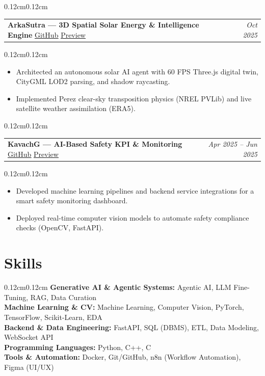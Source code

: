 \documentclass[10pt, letterpaper]{article}
\makeatletter
\newenvironment{onecolentry}
{\begin{adjustwidth}{0.12cm}{0.12cm}}
{\end{adjustwidth}}
\newenvironment{twocolentry}
{\begin{adjustwidth}{0.12cm}{0.12cm}
\begin{tabular*}{\linewidth}{l @{\extracolsep{\fill}} r}}
{\end{tabular*}
\end{adjustwidth}}
\newenvironment{highlights}
{\begin{itemize}[leftmargin=0.36cm, itemsep=0pt, topsep=1pt]}
{\end{itemize}}
\makeatother
\begin{document}
\begin{twocolentry}
\textbf{ArkaSutra — 3D Spatial Solar Energy \& Intelligence Engine} \quad \href{https://github.com/GuruMachanica/ArkaSutra}{\underline{GitHub}} \quad \href{https://arkasutra.netlify.app/}{\underline{Preview}} & \textit{Oct 2025}
\end{twocolentry}
\begin{onecolentry}
\begin{highlights}
\item Architected an autonomous solar AI agent with 60 FPS Three.js digital twin, CityGML LOD2 parsing, and shadow raycasting.
\item Implemented Perez clear-sky transposition physics (NREL PVLib) and live satellite weather assimilation (ERA5).
\end{highlights}
\end{onecolentry}

\begin{twocolentry}
\textbf{KavachG — AI-Based Safety KPI \& Monitoring} \quad \href{https://github.com/GuruMachanica/KavachG}{\underline{GitHub}} \quad \href{https://kavach-g.vercel.app/}{\underline{Preview}} & \textit{Apr 2025 – Jun 2025}
\end{twocolentry}
\begin{onecolentry}
\begin{highlights}
\item Developed machine learning pipelines and backend service integrations for a smart safety monitoring dashboard.
\item Deployed real-time computer vision models to automate safety compliance checks (OpenCV, FastAPI).
\end{highlights}
\end{onecolentry}

\section{Skills}
\begin{onecolentry}
\textbf{Generative AI \& Agentic Systems:} Agentic AI, LLM Fine-Tuning, RAG, Data Curation\\
\textbf{Machine Learning \& CV:} Machine Learning, Computer Vision, PyTorch, TensorFlow, Scikit-Learn, EDA\\
\textbf{Backend \& Data Engineering:} FastAPI, SQL (DBMS), ETL, Data Modeling, WebSocket API\\
\textbf{Programming Languages:} Python, C++, C\\
\textbf{Tools \& Automation:} Docker, Git/GitHub, n8n (Workflow Automation), Figma (UI/UX)
\end{onecolentry}
\end{document}
